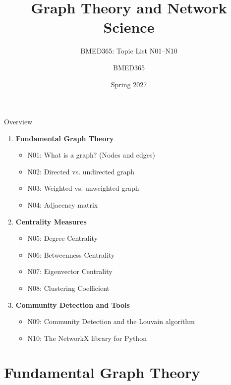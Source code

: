 \documentclass[aspectratio=169, 10pt]{beamer}
\title{Graph Theory and Network Science}
\subtitle{BMED365: Topic List N01--N10}
\author{BMED365}
\date{Spring 2027}
\begin{document}
\begin{frame}
    \titlepage
\end{frame}

\begin{frame}{Overview}
    \begin{enumerate}
        \item \textbf{Fundamental Graph Theory}
        \begin{itemize}
            \item N01: What is a graph? (Nodes and edges)
            \item N02: Directed vs. undirected graph
            \item N03: Weighted vs. unweighted graph
            \item N04: Adjacency matrix
        \end{itemize}
        \item \textbf{Centrality Measures}
        \begin{itemize}
            \item N05: Degree Centrality
            \item N06: Betweenness Centrality
            \item N07: Eigenvector Centrality
            \item N08: Clustering Coefficient
        \end{itemize}
        \item \textbf{Community Detection and Tools}
        \begin{itemize}
            \item N09: Community Detection and the Louvain algorithm
            \item N10: The NetworkX library for Python
        \end{itemize}
    \end{enumerate}
\end{frame}

\section{Fundamental Graph Theory}
\end{document}
